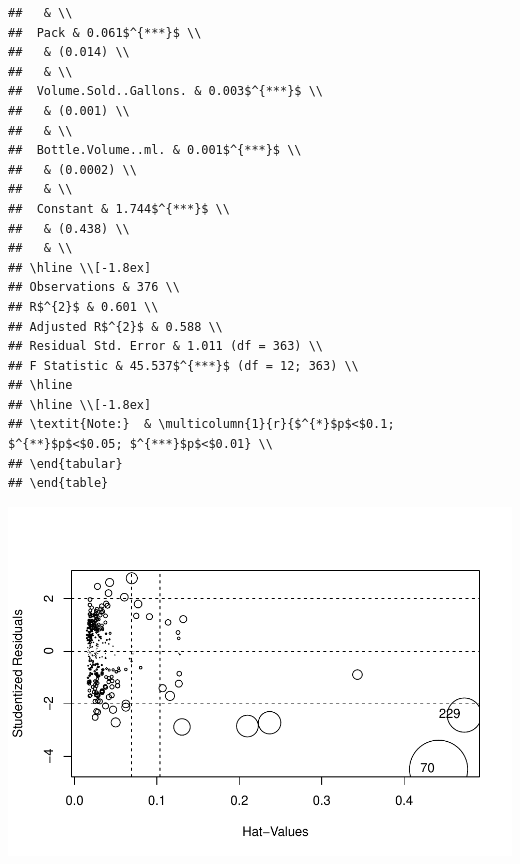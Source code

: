 \documentclass[]{elsarticle} %
\makeatletter
\newenvironment{Shaded}{\begin{snugshade}}{\end{snugshade}}
\newcommand{\KeywordTok}[1]{\textcolor[rgb]{0.13,0.29,0.53}{\textbf{{#1}}}}
\newcommand{\CommentTok}[1]{\textcolor[rgb]{0.56,0.35,0.01}{\textit{{#1}}}}
\newcommand{\NormalTok}[1]{{#1}}
\def\maxwidth{\ifdim\Gin@nat@width>\linewidth\linewidth
\else\Gin@nat@width\fi}
\let\Oldincludegraphics\includegraphics
\renewcommand{\includegraphics}[1]{\Oldincludegraphics[width=\maxwidth]{#1}}
\makeatother
\begin{document}
\begin{verbatim}
##   & \\ 
##  Pack & 0.061$^{***}$ \\ 
##   & (0.014) \\ 
##   & \\ 
##  Volume.Sold..Gallons. & 0.003$^{***}$ \\ 
##   & (0.001) \\ 
##   & \\ 
##  Bottle.Volume..ml. & 0.001$^{***}$ \\ 
##   & (0.0002) \\ 
##   & \\ 
##  Constant & 1.744$^{***}$ \\ 
##   & (0.438) \\ 
##   & \\ 
## \hline \\[-1.8ex] 
## Observations & 376 \\ 
## R$^{2}$ & 0.601 \\ 
## Adjusted R$^{2}$ & 0.588 \\ 
## Residual Std. Error & 1.011 (df = 363) \\ 
## F Statistic & 45.537$^{***}$ (df = 12; 363) \\ 
## \hline 
## \hline \\[-1.8ex] 
## \textit{Note:}  & \multicolumn{1}{r}{$^{*}$p$<$0.1; $^{**}$p$<$0.05; $^{***}$p$<$0.01} \\ 
## \end{tabular} 
## \end{table}
\end{verbatim}

\begin{Shaded}
\end{Shaded}

\includegraphics{Final_Project_files/figure-latex/unnamed-chunk-14-1.pdf}
\end{document}
